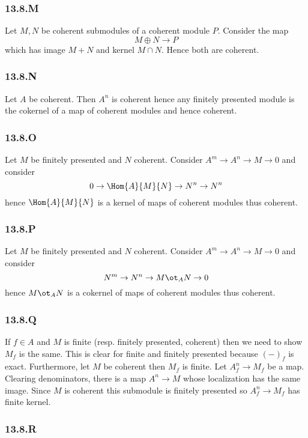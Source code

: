 \documentclass[12pt]{article}
\theoremstyle{plain}
\begin{document}
\subsubsection{13.8.M}

Let $M, N$ be coherent submodules of a coherent module $P$. Consider the map
\[ M \oplus N \to P \]
which has image $M + N$ and kernel $M \cap N$. Hence both are coherent.

\subsubsection{13.8.N}

Let $A$ be coherent. Then $A^n$ is coherent hence any finitely presented module is the cokernel of a map of coherent modules and hence coherent. 

\subsubsection{13.8.O}

Let $M$ be finitely presented and $N$ coherent. Consider $A^m \to A^n \to M \to 0$ and consider
\[ 0 \to \Hom{A}{M}{N} \to N^n \to N^n \]
hence $\Hom{A}{M}{N}$ is a kernel of maps of coherent modules thus coherent.

\subsubsection{13.8.P}

Let $M$ be finitely presented and $N$ coherent. Consider $A^m \to A^n \to M \to 0$ and consider
\[ N^m \to N^n \to M \ot_A N \to 0 \]
hence $M \ot_A N$ is a cokernel of maps of coherent modules thus coherent.

\subsubsection{13.8.Q}

If $f \in A$ and $M$ is finite (resp. finitely presented, coherent) then we need to show $M_f$ is the same. This is clear for finite and finitely presented because $(-)_f$ is exact. Furthermore, let $M$ be coherent then $M_f$ is finite. Let $A^n_f \to M_f$ be a map. Clearing denominators, there is a map $A^n \to M$ whose localization has the same image. Since $M$ is coherent this submodule is finitely presented so $A^n_f \to M_f$ has finite kernel.


\subsubsection{13.8.R}
\end{document}
